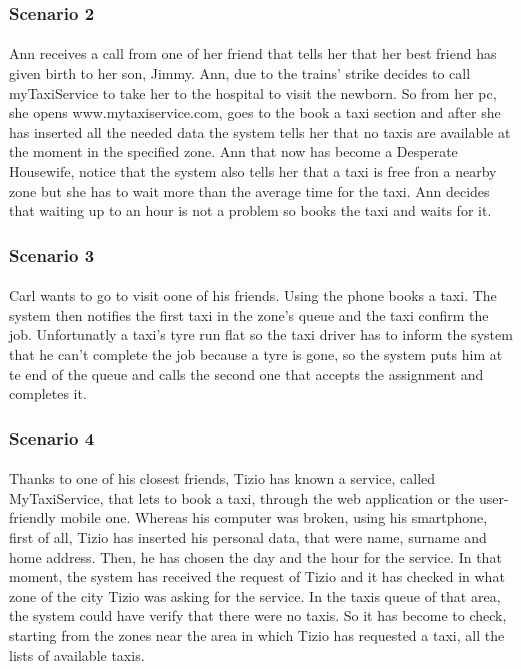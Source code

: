 		\subsubsection{Scenario 2}
		\paragraph*{}Ann receives a call from one of her friend that tells her that her best friend has given birth to her son, Jimmy. Ann, due to the trains' strike decides to call myTaxiService to take her to the hospital to visit the newborn. So from her pc, she opens www.mytaxiservice.com, goes to the book a taxi section and after she has inserted all the needed data the system tells her that no taxis are available at the moment in the specified zone. Ann that now has become a Desperate Housewife, notice that the system also tells her that a taxi is free fron a nearby zone but she has to wait more than the average time for the taxi. Ann decides that waiting up to an hour is not a problem so books the taxi and waits for it. 
		
		\subsubsection{Scenario 3}
		\paragraph*{}Carl wants to go to visit oone of his friends. Using the phone books a taxi. The system then notifies the first taxi in the zone's queue and the taxi confirm the job. Unfortunatly a taxi's tyre run flat so the taxi driver has to inform the system that he can't complete the job because a tyre is gone, so the system puts him at te end of the queue and calls the second one that accepts the assignment and completes it.
		
		\subsubsection{Scenario 4}
		\paragraph*{} Thanks to one of his closest friends, Tizio has known a service, called MyTaxiService, that lets to book a taxi, through the web application or the user-friendly mobile one.
		Whereas his computer was broken, using his smartphone, first of all, Tizio has inserted his personal data, that were name, surname and home address. Then, he has chosen the day and the hour for the service. In that moment, the system has received the request of Tizio and it has checked in what zone of the city Tizio was asking for the service. In the taxis queue of that area, the system could have verify that there were no taxis. So it has become to check, starting from the zones near the area in which Tizio has requested a taxi, all the lists of available taxis. 
		
